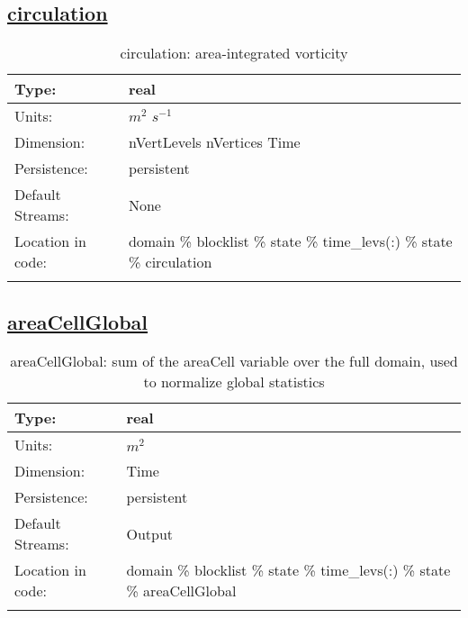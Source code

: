 \subsection[circulation]{\hyperref[sec:var_tab_state]{circulation}}
\label{subsec:var_sec_state_circulation}
\begin{center}
\begin{longtable}{| p{2.0in} | p{4.0in} |}
        \hline 
        Type: & real \\
        \hline 
        Units: & $m^2$ $s^{-1}$ \\
        \hline 
        Dimension: & nVertLevels nVertices Time \\
        \hline 
        Persistence: & persistent \\
        \hline 
		 Default Streams: & None \\
        \hline 
		 Location in code: & domain \% blocklist \% state \% time\_levs(:) \% state \% circulation \\
		 \hline 
    \caption{circulation: area-integrated vorticity}
\end{longtable}
\end{center}
\subsection[areaCellGlobal]{\hyperref[sec:var_tab_state]{areaCellGlobal}}
\label{subsec:var_sec_state_areaCellGlobal}
\begin{center}
\begin{longtable}{| p{2.0in} | p{4.0in} |}
        \hline 
        Type: & real \\
        \hline 
        Units: & $m^2$ \\
        \hline 
        Dimension: & Time \\
        \hline 
        Persistence: & persistent \\
        \hline 
		 Default Streams: & Output  \\
        \hline 
		 Location in code: & domain \% blocklist \% state \% time\_levs(:) \% state \% areaCellGlobal \\
		 \hline 
    \caption{areaCellGlobal: sum of the areaCell variable over the full domain, used to normalize global statistics}
\end{longtable}
\end{center}

